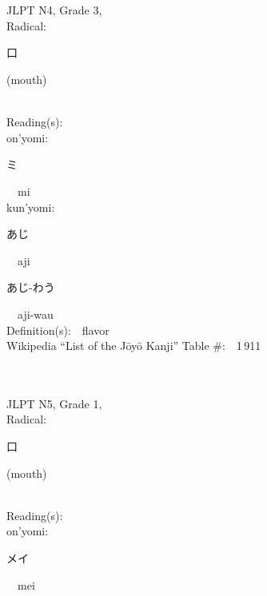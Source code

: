 \begin{multicols}{2}
\ \ \\
{\fontsize{34pt}{40pt}  }\ \ \\  %
{JLPT N4, Grade 3, \\Radical:\ \ {\begin{CJK}{UTF8}{min} 口 \end{CJK}} (mouth) } \\
Reading(s):\ \ \\
{\hspace*{1em}}on'yomi:\ \ \\
{\hspace*{2em}}{\begin{CJK}{UTF8}{min} ミ \end{CJK}}\ \ mi\ \ \\
{\hspace*{1em}}kun'yomi:\ \ \\
{\hspace*{2em}}{\begin{CJK}{UTF8}{min} あじ \end{CJK}}\ \ aji\ \ \\
{\hspace*{2em}}{\begin{CJK}{UTF8}{min} あじ-わう \end{CJK}}\ \ aji-wau\ \ \\
Definition(s):\ \ flavor \\
Wikipedia ``List of the J\=oy\=o Kanji'' Table \#:\ \ 1\,911 \\
\ \ \\
{\fontsize{34pt}{40pt}  }\ \ \\  %
{JLPT N5, Grade 1, \\Radical:\ \ {\begin{CJK}{UTF8}{min} 口 \end{CJK}} (mouth) } \\
Reading(s):\ \ \\
{\hspace*{1em}}on'yomi:\ \ \\
{\hspace*{2em}}{\begin{CJK}{UTF8}{min} メイ \end{CJK}}\ \ mei\ \ \\

\end{multicols}
